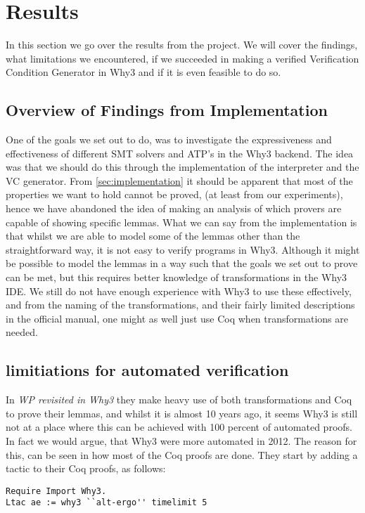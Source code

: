 \section{Results}\label{sec:results}
In this section we go over the results from the project.
We will cover the findings,
what limitations we encountered,
if we succeeded in making a verified Verification Condition Generator in Why3 and if it is even feasible to do so.

\subsection{Overview of Findings from Implementation}
One of the goals we set out to do, was to investigate the expressiveness and effectiveness of different SMT solvers and ATP's in the Why3 backend.
The idea was that we should do this through the implementation of the interpreter and the VC generator.
From \ref{sec:implementation} it should be apparent that most of the properties we want to hold cannot be proved, (at least from our experiments),
hence we have abandoned the idea of making an analysis of which provers are capable of showing specific lemmas.
What we can say from the implementation is that whilst we are able to model some of the lemmas other than the straightforward way,
it is not easy to verify programs in Why3.
Although it might be possible to model the lemmas in a way such that the goals we set out to prove can be met,
but this requires better knowledge of transformations in the Why3 IDE.
We still do not have enough experience with Why3 to use these effectively, and from the naming of the transformations, and their fairly limited descriptions in the official manual, one might as well just use Coq when transformations are needed.

\subsection{limitiations for automated verification}
In \textit{WP revisited in Why3} they make heavy use of both transformations and Coq to prove their lemmas,
and whilst it is almost 10 years ago, it seems Why3 is still not at a place where this can be achieved with 100 percent of automated proofs. In fact we would argue, that Why3 were more automated in 2012. The reason for this, can be seen in how most of the Coq proofs are done.
They start by adding a tactic to their Coq proofs, as follows:

\begin{lstlisting}
Require Import Why3.
Ltac ae := why3 ``alt-ergo'' timelimit 5
\end{lstlisting}

